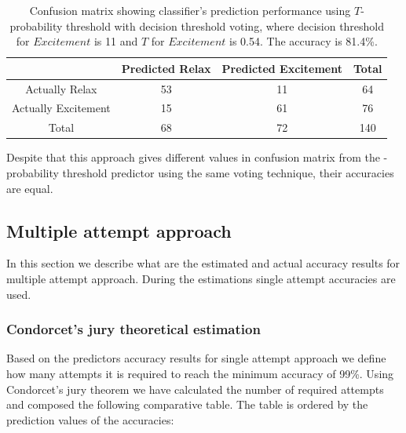 \documentclass[12pt]{article}
\theoremstyle{definition}
\begin{document}
\begin{table}[H]
\begin{center}
  \begin{tabular}{ | c | c | c | c | }
    \hline
     & Predicted Relax & Predicted Excitement & Total \\ \hline
    Actually Relax & 53 & 11 & 64 \\ \hline
    Actually Excitement & 15 & 61 & 76 \\ \hline
    Total & 68 & 72 & 140 \\ 
    \hline
  \end{tabular}
\end{center}
\caption{Confusion matrix showing classifier's prediction performance using $T$-probability threshold with decision threshold voting, where decision threshold for $Excitement$ is 11 and $T$ for $Excitement$ is 0.54. The accuracy is 81.4\%.} 
\end{table}

Despite that this approach gives different values in confusion matrix from the -probability threshold predictor using the same voting technique, their accuracies are equal.

\subsection{Multiple attempt approach}

In this section we describe what are the estimated and actual accuracy results for multiple attempt approach. During the estimations single attempt accuracies are used.
\subsubsection{Condorcet's jury theoretical estimation}\label{condorcet1}
Based on the predictors accuracy results for single attempt approach we define how many attempts it is required to reach the minimum accuracy of 99\%. Using Condorcet's jury theorem we have calculated the number of required attempts and composed the following comparative table. The table is ordered by the prediction values of the accuracies:
\end{document}

